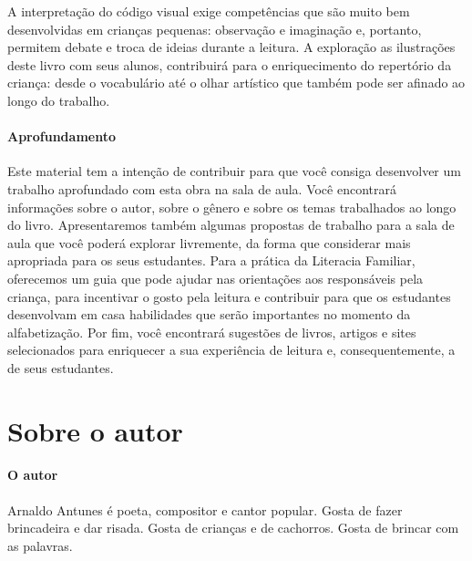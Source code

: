 \documentclass[11pt]{extarticle}
\begin{document}
A interpretação do código visual 
exige competências que são muito bem desenvolvidas em crianças pequenas: 
observação e imaginação e, portanto, permitem debate e troca de ideias durante 
a leitura. A exploração as ilustrações deste livro com seus alunos, contribuirá 
para o enriquecimento do repertório da criança: desde o vocabulário até o 
olhar artístico que também pode ser afinado ao longo do trabalho.

\paragraph{Aprofundamento} Este material tem a 
intenção de contribuir para que você consiga desenvolver um trabalho aprofundado 
com esta obra na sala de aula. Você encontrará informações sobre o autor, sobre 
o gênero e sobre os temas trabalhados ao longo do livro. Apresentaremos também 
algumas propostas de trabalho para a sala de aula que você poderá explorar livremente, 
da forma que considerar mais apropriada para os seus estudantes. Para a prática 
da Literacia Familiar, oferecemos um guia que pode ajudar nas orientações aos 
responsáveis pela criança, para incentivar o gosto pela leitura e contribuir para 
que os estudantes desenvolvam em casa habilidades que serão importantes no momento 
da alfabetização. Por fim, você encontrará sugestões de livros, artigos e sites 
selecionados para enriquecer a sua experiência de leitura e, 
consequentemente, a de seus estudantes.



\section{Sobre o autor}


\paragraph{O autor} 
Arnaldo Antunes é poeta, compositor e cantor popular.
Gosta de fazer brincadeira e dar risada.
Gosta de crianças e de cachorros.
Gosta de brincar com as palavras.

\reversemarginpar
\marginparwidth=5cm
\end{document}

